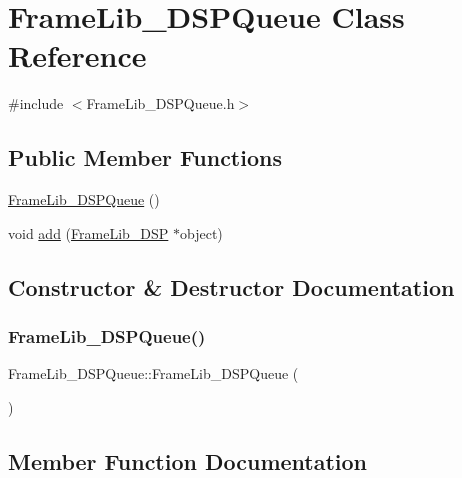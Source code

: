 \hypertarget{class_frame_lib___d_s_p_queue}{}\section{Frame\+Lib\+\_\+\+D\+S\+P\+Queue Class Reference}
\label{class_frame_lib___d_s_p_queue}


{\ttfamily \#include $<$Frame\+Lib\+\_\+\+D\+S\+P\+Queue.\+h$>$}

\subsection*{Public Member Functions}
\begin{DoxyCompactItemize}
\item 
\hyperlink{class_frame_lib___d_s_p_queue_a2d024c34bb9a458d759b9ec2decb7bc9}{Frame\+Lib\+\_\+\+D\+S\+P\+Queue} ()
\item 
void \hyperlink{class_frame_lib___d_s_p_queue_ad90022ddd65b8bdcc24f49cef2b41ba1}{add} (\hyperlink{class_frame_lib___d_s_p}{Frame\+Lib\+\_\+\+D\+SP} $\ast$object)
\end{DoxyCompactItemize}


\subsection{Constructor \& Destructor Documentation}
\mbox{\label{class_frame_lib___d_s_p_queue_a2d024c34bb9a458d759b9ec2decb7bc9}} 
\subsubsection{\texorpdfstring{Frame\+Lib\+\_\+\+D\+S\+P\+Queue()}{FrameLib\_DSPQueue()}}
{\footnotesize\ttfamily Frame\+Lib\+\_\+\+D\+S\+P\+Queue\+::\+Frame\+Lib\+\_\+\+D\+S\+P\+Queue (\begin{DoxyParamCaption}{ }\end{DoxyParamCaption})\hspace{0.3cm}{\ttfamily [inline]}}



\subsection{Member Function Documentation}
\mbox{\label{class_frame_lib___d_s_p_queue_ad90022ddd65b8bdcc24f49cef2b41ba1}} 
